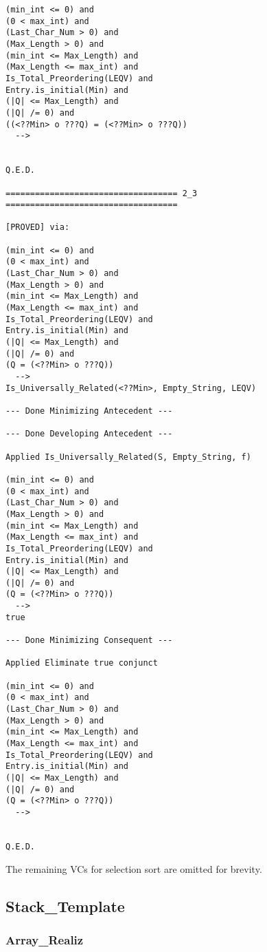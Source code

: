 \begin{lstlisting}[language=resolve]
(min_int <= 0) and
(0 < max_int) and
(Last_Char_Num > 0) and
(Max_Length > 0) and
(min_int <= Max_Length) and
(Max_Length <= max_int) and
Is_Total_Preordering(LEQV) and
Entry.is_initial(Min) and
(|Q| <= Max_Length) and
(|Q| /= 0) and
((<??Min> o ???Q) = (<??Min> o ???Q))
  -->


Q.E.D.

=================================== 2_3 ===================================

[PROVED] via:

(min_int <= 0) and
(0 < max_int) and
(Last_Char_Num > 0) and
(Max_Length > 0) and
(min_int <= Max_Length) and
(Max_Length <= max_int) and
Is_Total_Preordering(LEQV) and
Entry.is_initial(Min) and
(|Q| <= Max_Length) and
(|Q| /= 0) and
(Q = (<??Min> o ???Q))
  -->
Is_Universally_Related(<??Min>, Empty_String, LEQV)

--- Done Minimizing Antecedent ---

--- Done Developing Antecedent ---

Applied Is_Universally_Related(S, Empty_String, f)

(min_int <= 0) and
(0 < max_int) and
(Last_Char_Num > 0) and
(Max_Length > 0) and
(min_int <= Max_Length) and
(Max_Length <= max_int) and
Is_Total_Preordering(LEQV) and
Entry.is_initial(Min) and
(|Q| <= Max_Length) and
(|Q| /= 0) and
(Q = (<??Min> o ???Q))
  -->
true

--- Done Minimizing Consequent ---

Applied Eliminate true conjunct

(min_int <= 0) and
(0 < max_int) and
(Last_Char_Num > 0) and
(Max_Length > 0) and
(min_int <= Max_Length) and
(Max_Length <= max_int) and
Is_Total_Preordering(LEQV) and
Entry.is_initial(Min) and
(|Q| <= Max_Length) and
(|Q| /= 0) and
(Q = (<??Min> o ???Q))
  -->


Q.E.D.
\end{lstlisting}

The remaining VCs for selection sort are omitted for brevity.

	\subsection{Stack\_Template}	%

		\subsubsection{Array\_Realiz}	%

